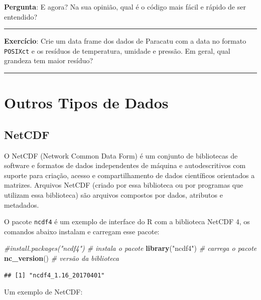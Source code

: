 \documentclass[]{book}
\newenvironment{Shaded}{\begin{snugshade}}{\end{snugshade}}
\newcommand{\KeywordTok}[1]{\textcolor[rgb]{0.13,0.29,0.53}{\textbf{#1}}}
\newcommand{\StringTok}[1]{\textcolor[rgb]{0.31,0.60,0.02}{#1}}
\newcommand{\CommentTok}[1]{\textcolor[rgb]{0.56,0.35,0.01}{\textit{#1}}}
\newcommand{\NormalTok}[1]{#1}
\theoremstyle{definition}
\theoremstyle{definition}
\theoremstyle{definition}
\theoremstyle{remark}
\begin{document}
{\textbf{Pergunta}: E agora? Na sua opinião, qual é o código mais fácil
e rápido de ser entendido?}

\begin{center}\rule{0.5\linewidth}{\linethickness}\end{center}

{\textbf{Exercício}: Crie um data frame dos dados de Paracatu com a data
no formato \texttt{POSIXct} e os resíduos de temperatura, umidade e
pressão. Em geral, qual grandeza tem maior resíduo?}

\begin{center}\rule{0.5\linewidth}{\linethickness}\end{center}

\section{Outros Tipos de Dados}\label{outros-tipos-de-dados}

\subsection{NetCDF}\label{netcdf}

O NetCDF (Network Common Data Form) é um conjunto de bibliotecas de
software e formatos de dados independentes de máquina e autodescritivos
com suporte para criação, acesso e compartilhamento de dados científicos
orientados a matrizes. Arquivos NetCDF (criado por essa biblioteca ou
por programas que utilizam essa biblioteca) são arquivos compostos por
dados, atributos e metadados.

O pacote \texttt{ncdf4} é um exemplo de interface do R com a biblioteca
NetCDF 4, os comandos abaixo instalam e carregam esse pacote:

\begin{Shaded}
\begin{Highlighting}[]
\CommentTok{#install.packages("ncdf4") # instala o pacote}
\KeywordTok{library}\NormalTok{(}\StringTok{"ncdf4"}\NormalTok{)           }\CommentTok{# carrega o pacote}
\KeywordTok{nc_version}\NormalTok{()               }\CommentTok{# versão da biblioteca}
\end{Highlighting}
\end{Shaded}

\begin{verbatim}
## [1] "ncdf4_1.16_20170401"
\end{verbatim}

Um exemplo de NetCDF:
\end{document}
